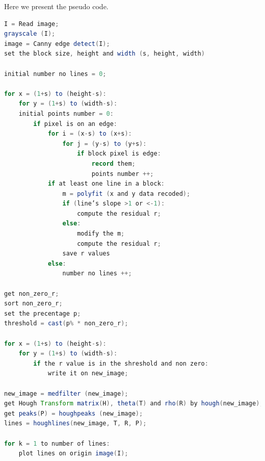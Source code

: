 Here we present the pseudo code.
\begin{lstlisting}[language=Java]
I = Read image;
grayscale (I);
image = Canny edge detect(I);
set the block size, height and width (s, height, width)

initial number no lines = 0;

for x = (1+s) to (height-s):
    for y = (1+s) to (width-s):
    initial points number = 0:
        if pixel is on an edge:
            for i = (x-s) to (x+s):
                for j = (y-s) to (y+s):
        	        if block pixel is edge:
                        record them;
                        points number ++;
        	if at least one line in a block:
        	    m = polyfit (x and y data recoded);
        	    if (line’s slope >1 or <-1):
        	        compute the residual r;
        	    else:
        	        modify the m;
        	        compute the residual r;
        	    save r values
        	else:
                number no lines ++;

get non_zero_r;
sort non_zero_r;
set the precentage p;
threshold = cast(p% * non_zero_r);

for x = (1+s) to (height-s):
    for y = (1+s) to (width-s):
        if the r value is in the shreshold and non zero:
	        write it on new_image;

new_image = medfilter (new_image);
get Hough Transform matrix(H), theta(T) and rho(R) by hough(new_image);
get peaks(P) = houghpeaks (new_image);
lines = houghlines(new_image, T, R, P);

for k = 1 to number of lines:
    plot lines on origin image(I);

\end{lstlisting}
